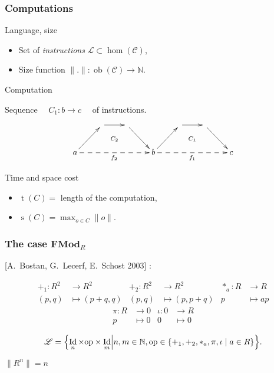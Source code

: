 \documentclass[10pt,handout]{beamer}
\newcommand{\cat}[1]{\mathscr{#1}}
\newcommand{\lcat}[1]{\mathbf{#1}}
\newcommand{\C}{\cat{C}}
\renewcommand{\L}{\cat{L}}
\newcommand{\size}[1]{\lVert#1\rVert}
\DeclareMathOperator{\ob}{ob}
\DeclareMathOperator{\Id}{Id}
\newcommand{\N}{\mathbb{N}}
\newcommand{\ra}{\rightarrow}
\DeclareMathOperator{\Time}{t}
\DeclareMathOperator{\Space}{s}
\begin{document}
\begin{frame}
  \frametitle{Computations}

  \begin{block}{Language, size}
    \begin{itemize}
    \item Set of \emph{instructions} \hfill $\L \subset \hom(\C)$,
    \item Size function \hfill $\size{.} : \ob(\C)\ra\N$.
    \end{itemize}
  \end{block}

  \begin{block}{Computation}
    \begin{center}
      Sequence $\quad C_1:b\ra c\quad$ of instructions.
    \end{center}
  \end{block}

  \[\xymatrix{
    & \ar[r]\ar@{}[dr]|{C_2} & \ar[dr] &
    & \ar[r]\ar@{}[dr]|{C_1} & \ar[dr] \\
    a \ar[ur]\ar@{-->}[rrr]_{f_2} &&& b
    \ar[ur]\ar@{-->}[rrr]_{f_1} &&& c
  }\]

  \begin{block}{Time and space cost}
    \begin{itemize}
    \item $\Time(C) = $ length of the computation,
    \item $\Space(C) = \max_{o\in C}\size{o}$.
    \end{itemize}
  \end{block}

\end{frame}


\begin{frame}
  \frametitle{The case $\lcat{FMod}_R$}
  [A.~Bostan, G.~Lecerf, E.~Schost 2003] :

  \begin{align*}
    +_1 : R^2 &\ra R^2         &   +_2 : R^2&\ra R^2       &  *_a : R&\ra R\\
    (p,q)&\mapsto(p+q,q)  &      (p,q)&\mapsto(p,p+q) &       p&\mapsto ap
  \end{align*}
  \begin{align*}
    \pi : R&\ra 0     &  \iota : 0&\ra R   \\
          p&\mapsto0  &          0&\mapsto0
  \end{align*}
  
  \begin{block}{}
    \begin{equation*}
      \label{eq:linlang}
      \L = \Bigl\{\Id_n\times\mathrm{op}\times\Id_m \Bigl\lvert
      n,m\in\N, \mathrm{op}\in\{+_1,+_2,*_a,\pi,\iota\;|\;a\in R\} \Bigr\}
      \text{.}
    \end{equation*}
  \end{block}

  \begin{block}{}
    \begin{center}
      $\size{R^n} = n$
    \end{center}
  \end{block}

\end{frame}
\end{document}
